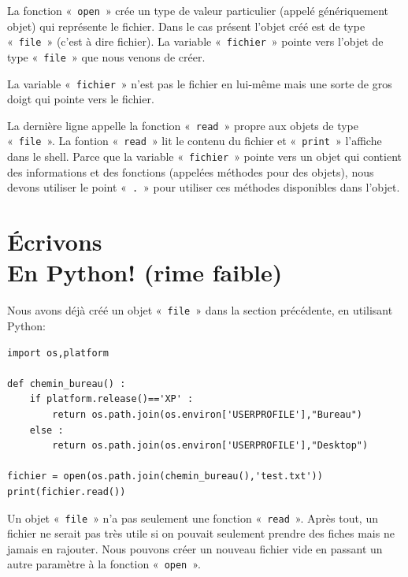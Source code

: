 La fonction «~\texttt{open}~»  crée un type de valeur particulier (appelé génériquement objet) qui représente le fichier. Dans le cas présent l'objet créé est de type «~\texttt{file}~» (c'est à dire fichier). La variable «~\texttt{fichier}~» pointe vers l'objet de type «~\texttt{file}~» que nous venons de créer.

La variable «~\texttt{fichier}~» n'est pas le fichier en lui-même mais une sorte de gros doigt qui pointe vers le fichier.

La dernière ligne appelle la fonction «~\texttt{read}~» propre aux objets de type «~\texttt{file}~». La fontion «~\texttt{read}~» lit le contenu du fichier et «~\texttt{print}~» l'affiche dans le shell. Parce que la variable «~\texttt{fichier}~» pointe vers un objet qui contient des informations et des fonctions (appelées méthodes pour des objets), nous devons utiliser le point «~\texttt{.}~»  pour utiliser ces méthodes disponibles dans l'objet.

\begin{center}
\end{center}

\section{Écrivons\\
En Python! (rime faible)}

Nous avons déjà créé un objet «~\texttt{file}~» dans la section précédente, en utilisant Python:

\begin{Verbatim}[frame=single,rulecolor=\color{gray}, label=ne pas saisir]
import os,platform

def chemin_bureau() :
    if platform.release()=='XP' :
        return os.path.join(os.environ['USERPROFILE'],"Bureau")
    else :
        return os.path.join(os.environ['USERPROFILE'],"Desktop")
    
fichier = open(os.path.join(chemin_bureau(),'test.txt'))
print(fichier.read())
\end{Verbatim}

Un objet «~\texttt{file}~» n'a pas seulement une fonction «~\texttt{read}~». Après tout, un fichier ne serait pas très utile si on pouvait seulement prendre des fiches mais ne jamais en rajouter. Nous pouvons créer un nouveau fichier vide en passant un autre paramètre à la fonction «~\texttt{open}~».

